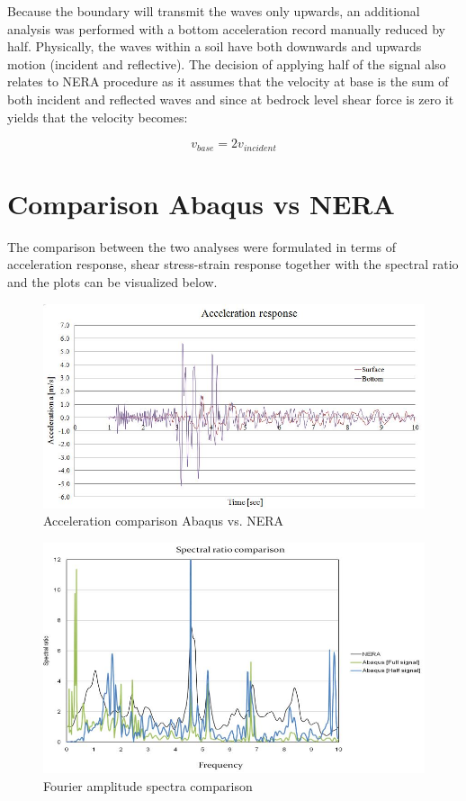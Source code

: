 	Because the boundary will transmit the waves only upwards, an additional analysis was performed with a bottom acceleration record manually reduced by half. Physically, the waves within a soil have both downwards and upwards motion (incident and reflective). The decision of applying half of the signal also relates to NERA procedure as it assumes that the velocity at base is the sum of both incident and reflected waves and since at bedrock level shear force is zero it yields that the velocity becomes:
	
	\begin{equation}
	v_{base}=2v_{incident}
	\end{equation} 
	
	\section{Comparison Abaqus vs NERA}
	The comparison between the two analyses were formulated in terms of acceleration response, shear stress-strain response together with the spectral ratio and the plots can be visualized below. 
	
	\begin{figure}[h!]
		\centering
		\includegraphics[width=0.7\linewidth]{"acc_response2"}
		\caption{Acceleration comparison Abaqus vs. NERA}
		\label{comp1}
	\end{figure}
	
	\begin{figure}[h!]
		\centering
		\includegraphics[width=0.7\linewidth]{"spectral2"}
		\caption{Fourier amplitude spectra comparison}
		\label{fourier2}
	\end{figure}
	
